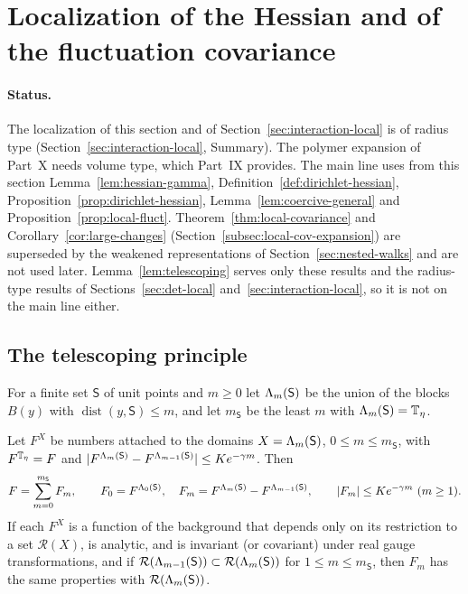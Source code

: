 \section{Localization of the Hessian and of the fluctuation covariance}\label{sec:localization}

\paragraph{Status.} The localization of this section and of Section~\ref{sec:interaction-local} is of radius type (Section~\ref{sec:interaction-local}, Summary). The polymer expansion of Part~X needs volume type, which Part~IX provides. The main line uses from this section Lemma~\ref{lem:hessian-gamma}, Definition~\ref{def:dirichlet-hessian}, Proposition~\ref{prop:dirichlet-hessian}, Lemma~\ref{lem:coercive-general} and Proposition~\ref{prop:local-fluct}. Theorem~\ref{thm:local-covariance} and Corollary~\ref{cor:large-changes} (Section~\ref{subsec:local-cov-expansion}) are superseded by the weakened representations of Section~\ref{sec:nested-walks} and are not used later. Lemma~\ref{lem:telescoping} serves only these results and the radius-type results of Sections~\ref{sec:det-local} and~\ref{sec:interaction-local}, so it is not on the main line either.

\subsection{The telescoping principle}\label{ss:37.1}

For a finite set $\mathsf S$ of unit points and $m\ge0$ let $\Lambda_m(\mathsf S)$ be the union of the blocks $B(y)$ with $\operatorname{dist}(y,\mathsf S)\le m$, and let $m_{\mathsf S}$ be the least $m$ with $\Lambda_m(\mathsf S)=\mathbb T_\eta$.

\begin{lemma}[Telescoping]\label{lem:telescoping}
Let $F^X$ be numbers attached to the domains $X=\Lambda_m(\mathsf S)$, $0\le m\le m_{\mathsf S}$, with $F^{\mathbb T_\eta}=F$ and $|F^{\Lambda_m(\mathsf S)}-F^{\Lambda_{m-1}(\mathsf S)}|\le Ke^{-\gamma m}$. Then
\[
F=\sum_{m=0}^{m_{\mathsf S}}F_m,\qquad F_0=F^{\Lam_0(\mathsf S)},\quad F_m=F^{\Lam_m(\mathsf S)}-F^{\Lam_{m-1}(\mathsf S)},\qquad|F_m|\le Ke^{-\gamma m}\ (m\ge1).
\]
If each $F^X$ is a function of the background that depends only on its restriction to a set $\mathcal R(X)$, is analytic, and is invariant (or covariant) under real gauge transformations, and if $\mathcal R(\Lambda_{m-1}(\mathsf S))\subset\mathcal R(\Lambda_m(\mathsf S))$ for $1\le m\le m_{\mathsf S}$, then $F_m$ has the same properties with $\mathcal R(\Lambda_m(\mathsf S))$.
\end{lemma}

